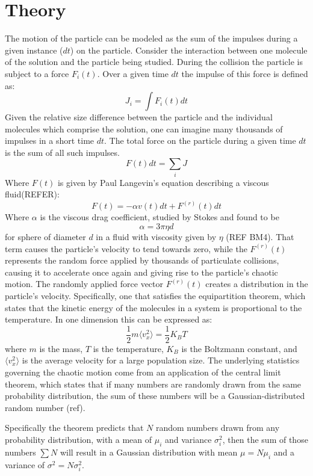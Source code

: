 \documentclass[aps,prb,twocolumn,groupedaddress,nofootinbib,floatfix]{revtex4}
\newcommand{\beq}{\begin{equation}}
\newcommand{\eeq}{\end{equation}}
\begin{document}
\section*{Theory}
The motion of the particle can be modeled as the sum of the impulses during a given instance ($dt$) on the particle. Consider the interaction between one molecule of the solution and the particle being studied. During the collision the particle is subject to a force $F_i(t)$. Over a given time $dt$ the impulse of this force is defined as:
\beq
J_i=\int F_i(t)dt
\label{eq:1}
\eeq
Given the relative size difference between the particle and the individual molecules which comprise the solution, one can imagine many thousands of impulses in a short time $dt$. 
The total force on the particle during a given time $dt$ is the sum of all such impulses.
\beq
F(t)dt=\sum_{i}J
\label{eq:2}
\eeq
Where $F(t)$ is given by Paul Langevin's equation describing a viscous fluid(REFER):
\beq
F(t)=-\alpha{}v(t)dt+F^{(r)}(t)dt
\label{eq:Langevin Force}
\eeq
Where $\alpha$ is the viscous drag coefficient, studied by Stokes and found to be
\beq
\alpha{}=3\pi{}\eta{}d
\label{eq:drag coeff}
\eeq
for sphere of diameter $d$ in a fluid with viscosity given by $\eta$ (REF BM4). That term causes the particle's velocity to tend towards zero, while the $F^{(r)}(t)$ represents the random force applied by thousands of particulate collisions, causing it to accelerate once again and giving rise to the particle's chaotic motion. The randomly applied force vector $F^{(r)}(t)$ creates a distribution in the particle's velocity. Specifically, one that satisfies the equipartition theorem, which states that the kinetic energy of the molecules in a system is proportional to the temperature.  In one dimension this can be expressed as:
\beq
\frac{1}{2}m\langle{}v_{x}^{2}\rangle=\frac{1}{2}K_{B}T
\label{eq:equipartition}
\eeq
where $m$ is the mass, $T$ is the temperature, $K_B$ is the Boltzmann constant, and $\langle{}v_{x}^{2}\rangle$ is the average velocity for a large population size.
The underlying statistics governing the chaotic motion come from an application of the central limit theorem, which states that if many numbers are randomly drawn from the same probability distribution, the sum of these numbers will be a Gaussian-distributed random number (ref).

Specifically the theorem predicts that $N$ random numbers drawn from any probability distribution, with a mean of $\mu_i$ and variance $\sigma_{i}^2$, then the sum of those numbers $\sum N$ will result in a Gaussian distribution with mean $\mu = N\mu_i$ and a variance of $\sigma^2=N\sigma_{i}^2$. 
\end{document}
